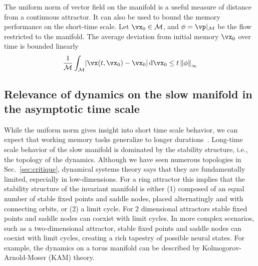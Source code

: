 \documentclass{article} %
\newcommand{\mpcomment}[1]{\textcolor{mpcolor}{(#1)}}
\newcounter{ct}
\newcommand{\dm}[1]{\ensuremath{\mathrm{d}{#1}}} %
\newcommand{\manifold}{\mathcal{M}}
\newcommand{\uniformNorm}[1]{\left\|#1\right\|_\infty} %
\DeclarePairedDelimiter{\abs}{\lvert}{\rvert}
\theoremstyle{definition}
\theoremstyle{remark}
\begin{document}
The uniform norm of vector field on the manifold is a useful measure of distance from a continuous attractor.
It can also be used to bound the memory performance on the short-time scale. %
Let $\vx_0 \in \manifold$, and $\phi = \vp\vert_\manifold$ be the flow restricted to the manifold.
The average deviation from initial memory $\vx_0$ over time is bounded linearly
\begin{align}\label{eq:distance:ub}
\frac{1}{\manifold}\int_\manifold
\abs{\vx(t, \vx_0) - \vx_0}\,
\dm{\vx_0}
\leq t\uniformNorm{\phi}
\end{align}

\subsection{Relevance of dynamics on the slow manifold in the asymptotic time scale}\label{sec:attractor_bif}
While the uniform norm gives insight into short time scale behavior, we can expect that working memory tasks generalize to longer durations~\citep{Park2023a}.
Long-time scale behavior of the slow manifold is dominated by the stability structure, i.e., the topology of the dynamics.
Although we have seen numerous topologies in Sec.~\ref{sec:critique}, dynamical systems theory says that they are fundamentally limited, especially in low-dimensions.
For a ring attractor this implies that the stability structure of the invariant manifold is either
(1) composed of an equal number of stable fixed points and saddle nodes, placed alternatingly and with connecting orbits, or (2) a limit cycle.
For 2 dimensional attractors stable fixed points and saddle nodes can coexist with limit cycles.
In more complex scenarios, such as a two-dimensional attractor, stable fixed points and saddle nodes can coexist with limit cycles, creating a rich tapestry of possible neural states.
For example, the dynamics on a torus manifold can be described by Kolmogorov-Arnold-Moser (KAM) theory.
\end{document}

